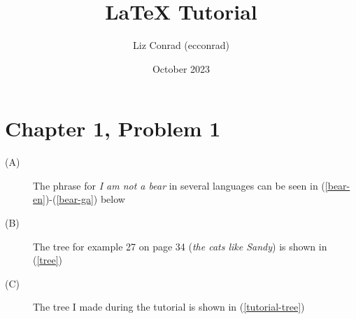 \documentclass{article}
\title{LaTeX Tutorial}
\author{Liz Conrad (ecconrad)}
\date{October 2023}
\begin{document}
\maketitle


\section*{Chapter 1, Problem 1}

\begin{description}
    
    \item[(A)] The phrase for \textit{I am not a bear} in several languages can be seen in (\ref{bear-en})-(\ref{bear-ga}) below
    
    
    \item[(B)] The tree for example 27 on page 34 (\textit{the cats like Sandy}) is shown in (\ref{tree})
    
    \item[(C)] The tree I made during the tutorial is shown in (\ref{tutorial-tree})
    
\end{description}
\end{document}
